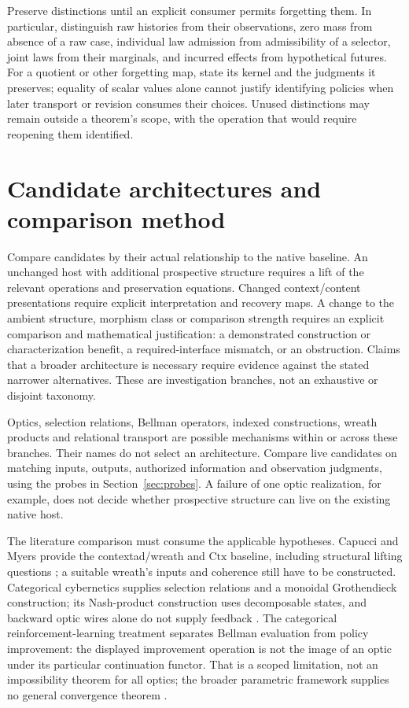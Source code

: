 \documentclass[11pt]{article}
\begin{document}
Preserve distinctions until an explicit consumer permits forgetting them. In particular, distinguish raw histories from their observations, zero mass from absence of a raw case, individual law admission from admissibility of a selector, joint laws from their marginals, and incurred effects from hypothetical futures. For a quotient or other forgetting map, state its kernel and the judgments it preserves; equality of scalar values alone cannot justify identifying policies when later transport or revision consumes their choices. Unused distinctions may remain outside a theorem's scope, with the operation that would require reopening them identified.

\section{Candidate architectures and comparison method}\label{sec:architectures}

Compare candidates by their actual relationship to the native baseline. An unchanged host with additional prospective structure requires a lift of the relevant operations and preservation equations. Changed context/content presentations require explicit interpretation and recovery maps. A change to the ambient structure, morphism class or comparison strength requires an explicit comparison and mathematical justification: a demonstrated construction or characterization benefit, a required-interface mismatch, or an obstruction. Claims that a broader architecture is necessary require evidence against the stated narrower alternatives. These are investigation branches, not an exhaustive or disjoint taxonomy.

Optics, selection relations, Bellman operators, indexed constructions, wreath products and relational transport are possible mechanisms within or across these branches. Their names do not select an architecture. Compare live candidates on matching inputs, outputs, authorized information and observation judgments, using the probes in Section~\ref{sec:probes}. A failure of one optic realization, for example, does not decide whether prospective structure can live on the existing native host.

The literature comparison must consume the applicable hypotheses. Capucci and Myers provide the contextad/wreath and \(\mathrm{Ctx}\) baseline, including structural lifting questions \cite{cm}; a suitable wreath's inputs and coherence still have to be constructed. Categorical cybernetics supplies selection relations and a monoidal Grothendieck construction; its Nash-product construction uses decomposable states, and backward optic wires alone do not supply feedback \cite{cyber}. The categorical reinforcement-learning treatment separates Bellman evaluation from policy improvement: the displayed improvement operation is not the image of an optic under its particular continuation functor. That is a scoped limitation, not an impossibility theorem for all optics; the broader parametric framework supplies no general convergence theorem \cite{rl}.
\end{document}
